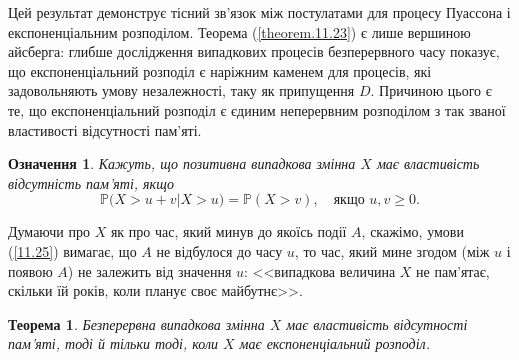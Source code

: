 \documentclass[12pt,fleqn]{article}
\newtheorem{theorem}{Теорема}[section]
\newtheorem{definition}{Означення}[section]
\numberwithin{figure}{section}
\numberwithin{equation}{section}
\begin{document}
Цей результат демонструє тісний зв'язок між постулатами для процесу Пуассона і експоненціальним розподілом. Теорема (\ref{theorem.11.23}) є лише вершиною айсберга: глибше дослідження випадкових процесів безперервного часу показує, що експоненціальний розподіл є наріжним каменем для процесів, які задовольняють умову незалежності, таку як припущення $D$. Причиною цього є те, що експоненціальний розподіл є єдиним неперервним розподілом з так званої властивості відсутності пам'яті.

\begin{definition}\label{def.11.24}
    Кажуть, що позитивна випадкова змінна $X$ має властивість відсутність пам'яті, якщо
    \begin{equation}\label{11.25}
      \mathbb{P}\big(X>u+v\big|X>u\big)=\mathbb{P}(X>v), \quad \text{якщо $u, v \geq 0$.}
    \end{equation}
\end{definition}

Думаючи про $X$ як про час, який минув до якоїсь події $A$, скажімо, умови (\ref{11.25}) вимагає, що $A$ не відбулося до часу $u$, то час, який мине згодом (між $u$ і появою $A$) не залежить від значення $u$: <<випадкова величина $X$ не пам'ятає, скільки їй років, коли планує своє майбутнє>>.

\begin{theorem}\label{theorem.11.26}
  Безперервна випадкова змінна $X$ має властивість відсутності пам'яті, тоді й тільки тоді, коли $X$ має експоненціальний розподіл.
\end{theorem}
\end{document}
